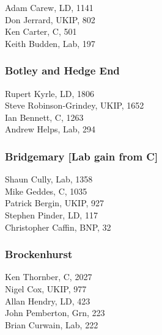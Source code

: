 \documentclass[a4paper,openany,10pt]{book}
\begin{document}


Adam Carew, LD, 1141\\
Don Jerrard, UKIP, 802\\
Ken Carter, C, 501\\
Keith Budden, Lab, 197\\


\subsubsection*{Botley and Hedge End}



Rupert Kyrle, LD, 1806\\
{Steve Robinson-Grindey}, UKIP, 1652\\
Ian Bennett, C, 1263\\
Andrew Helps, Lab, 294\\


\subsubsection*{Bridgemary \hspace*{\fill}\nolinebreak[1]%
\enspace\hspace*{\fill}
[Lab gain from C]}



Shaun Cully, Lab, 1358\\
Mike Geddes, C, 1035\\
Patrick Bergin, UKIP, 927\\
Stephen Pinder, LD, 117\\
Christopher Caffin, BNP, 32\\


\subsubsection*{Brockenhurst}



Ken Thornber, C, 2027\\
Nigel Cox, UKIP, 977\\
Allan Hendry, LD, 423\\
John Pemberton, Grn, 223\\
Brian Curwain, Lab, 222\\
\end{document}
